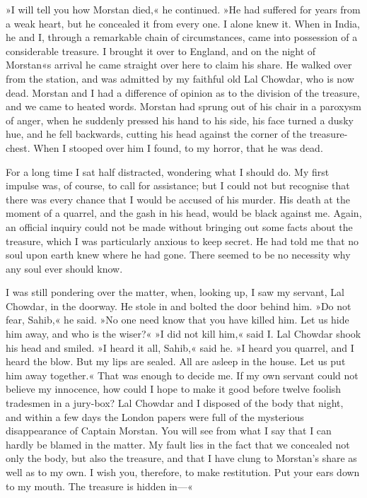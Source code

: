 »I will tell you how Morstan died,« he continued. »He had suffered for years from a weak heart, but he concealed it from every one. I alone knew it. When in India, he and I, through a remarkable chain of circumstances, came into possession of a considerable treasure. I brought it over to England, and on the night of Morstan«s arrival he came straight over here to claim his share. He walked over from the station, and was admitted by my faithful old Lal Chowdar, who is now dead. Morstan and I had a difference of opinion as to the division of the treasure, and we came to heated words. Morstan had sprung out of his chair in a paroxysm of anger, when he suddenly pressed his hand to his side, his face turned a dusky hue, and he fell backwards, cutting his head against the corner of the treasure-chest. When I stooped over him I found, to my horror, that he was dead.

For a long time I sat half distracted, wondering what I should do. My first impulse was, of course, to call for assistance; but I could not but recognise that there was every chance that I would be accused of his murder. His death at the moment of a quarrel, and the gash in his head, would be black against me. Again, an official inquiry could not be made without bringing out some facts about the treasure, which I was particularly anxious to keep secret. He had told me that no soul upon earth knew where he had gone. There seemed to be no necessity why any soul ever should know.

I was still pondering over the matter, when, looking up, I saw my servant, Lal Chowdar, in the doorway. He stole in and bolted the door behind him. »Do not fear, Sahib,« he said. »No one need know that you have killed him. Let us hide him away, and who is the wiser?« »I did not kill him,« said I. Lal Chowdar shook his head and smiled. »I heard it all, Sahib,« said he. »I heard you quarrel, and I heard the blow. But my lips are sealed. All are asleep in the house. Let us put him away together.« That was enough to decide me. If my own servant could not believe my innocence, how could I hope to make it good before twelve foolish tradesmen in a jury-box? Lal Chowdar and I disposed of the body that night, and within a few days the London papers were full of the mysterious disappearance of Captain Morstan. You will see from what I say that I can hardly be blamed in the matter. My fault lies in the fact that we concealed not only the body, but also the treasure, and that I have clung to Morstan's share as well as to my own. I wish you, therefore, to make restitution. Put your ears down to my mouth. The treasure is hidden in—«

